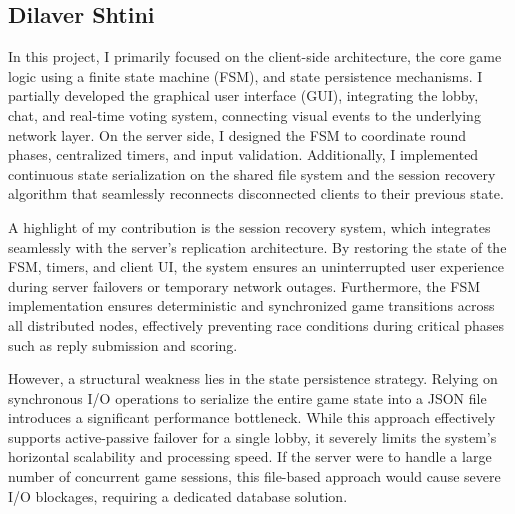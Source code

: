 \documentclass{scrartcl}
\begin{document}
\subsection{Dilaver Shtini}
In this project, I primarily focused on the client-side architecture, the core game logic using a finite state machine (FSM), and state persistence mechanisms.
I partially developed the graphical user interface (GUI), integrating the lobby, chat, and real-time voting system, connecting visual events to
the underlying network layer. On the server side, I designed the FSM to coordinate round phases, centralized timers, and input validation. Additionally, I
implemented continuous state serialization on the shared file system and the session recovery algorithm that seamlessly reconnects disconnected clients to
their previous state.

A highlight of my contribution is the session recovery system, which integrates seamlessly with the server's replication architecture. By restoring the state
of the FSM, timers, and client UI, the system ensures an uninterrupted user experience during server failovers or temporary network outages. Furthermore,
the FSM implementation ensures deterministic and synchronized game transitions across all distributed nodes, effectively preventing race conditions during
critical phases such as reply submission and scoring.

However, a structural weakness lies in the state persistence strategy. Relying on synchronous I/O operations to serialize the entire game state into a JSON
file introduces a significant performance bottleneck. While this approach effectively supports active-passive failover for a single lobby, it severely limits
the system's horizontal scalability and processing speed. If the server were to handle a large number of concurrent game sessions, this file-based approach
would cause severe I/O blockages, requiring a dedicated database solution.
\end{document}

